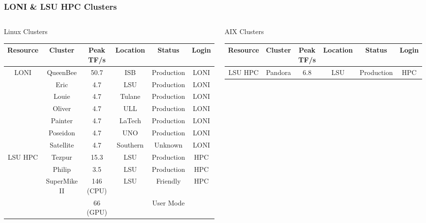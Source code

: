 \documentclass[slidestop,mathserif,compress,xcolor=svgnames,table]{beamer}
\begin{document}
\begin{frame}
  \frametitle{\small LONI \& LSU HPC Clusters}
  \begin{columns}
    \column{11cm}
    \vspace{-0.7cm}
  \footnotesize{
    \begin{block}{Linux Clusters}
      \begin{center}
        \begin{tabular}{|c|c|c|c|c|c|}
          \hline
          Resource & Cluster & Peak TF/s & Location & Status & Login\\
          \hline
          \multirow{6}{*}{LONI} & QueenBee & 50.7 & ISB & Production & LONI \\
          & Eric & 4.7 & LSU & Production & LONI\\
          & Louie & 4.7 & Tulane & Production & LONI\\
          & Oliver & 4.7 & ULL & Production & LONI\\
          & Painter & 4.7 & LaTech & Production & LONI\\
          & Poseidon & 4.7 & UNO & Production & LONI\\
          & Satellite & 4.7 & Southern & Unknown & LONI\\
          \hline
          \multirow{4}{*}{ LSU HPC} & Tezpur & 15.3 & LSU & Production & HPC\\
          & Philip & 3.5 & LSU & Production & HPC\\
          \cline{2-6}
          & \multirow{2}{*}{SuperMike II} & 146 (CPU) & \multirow{2}{*}{LSU} & Friendly & \multirow{2}{*}{HPC} \\
          &                            & 66 (GPU) & & User Mode & \\
          \hline
        \end{tabular}
      \end{center}
    \end{block}
    \begin{block}{AIX Clusters}
      \begin{center}
        \def\firstrowcolor{\rowcolor{green}}
        \def\secondrowcolor{\rowcolor{blue!50}}
        \def\thirdrowcolor{\rowcolor{tigerspurple!80}}
        \begin{tabular}{|c|c|c|c|c|c|}
          \hline
          Resource & Cluster & Peak TF/s & Location & Status & Login\\
          \hline
          LSU HPC & Pandora & 6.8 & LSU & Production & HPC\\
          \hline
        \end{tabular}
      \end{center}
    \end{block}
  }
  \end{columns}
\end{frame}
\end{document}
